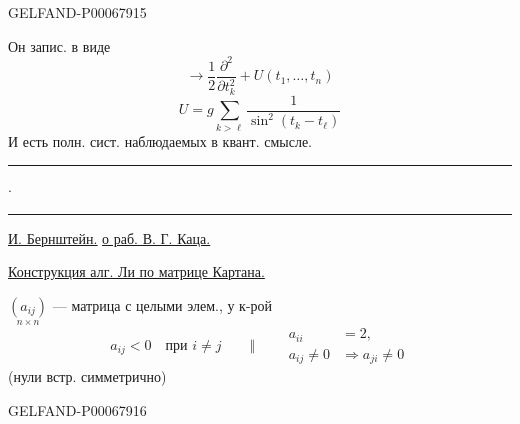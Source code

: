 \begin{GelfandAdjacentEvidence}{GELFAND-P000679}{15}

Он запис. в виде
\[
\longrightarrow\frac12\frac{\partial^2}{\partial t_k^2}
 +U(t_1,\ldots,t_n)
\]
\[
U=g\sum_{k>\ell}\frac1{\sin^2(t_k-t_\ell)}
\]
И есть полн. сист. наблюдаемых в квант. смысле.

\noindent\rule{14mm}{.45pt}\enspace\(\cdot\)\enspace\rule{15mm}{.45pt}

\underline{\underline{И. Бернштейн.}}\qquad
\underline{\underline{о раб. В. Г. Каца.}}

\underline{Конструкция алг. Ли по матрице Картана.}

\(\underset{n\times n}{(a_{ij})}\) --- матрица с целыми элем., у к-рой
\[
a_{ij}<0\quad\text{при }i\ne j
\qquad\Vert\qquad
\begin{aligned}
a_{ii}&=2,\\
a_{ij}\ne0&\Rightarrow a_{ji}\ne0
\end{aligned}
\]
(нули встр. симметрично)
\end{GelfandAdjacentEvidence}
\begin{GelfandAdjacentEvidence}{GELFAND-P000679}{16}

\end{GelfandAdjacentEvidence}



